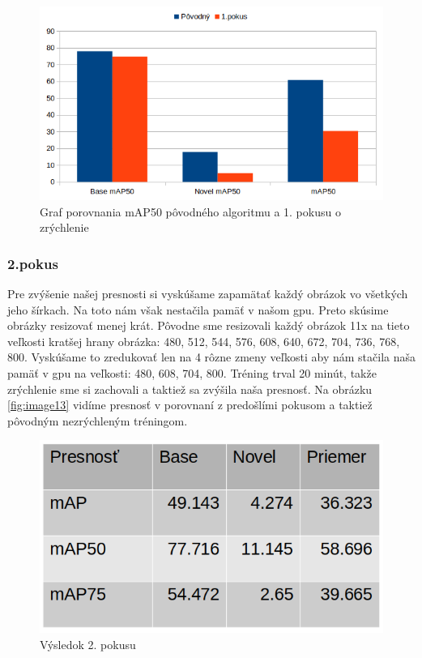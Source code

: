 \begin{figure}[H]
\centering
\includegraphics[width=\textwidth]{images/faster_1attempt_chart.png}
\caption{Graf porovnania mAP50 pôvodného algoritmu a 1. pokusu o zrýchlenie}
\label{fig:image11}
\end{figure}

\subsubsection{2.pokus}

Pre zvýšenie našej presnosti si vyskúšame zapamätať každý obrázok vo všetkých jeho šírkach. Na toto nám však nestačila pamäť v našom gpu. Preto skúsime obrázky resizovať menej krát. Pôvodne sme resizovali každý obrázok 11x na tieto veľkosti kratšej hrany obrázka: 480, 512, 544, 576, 608, 640, 672, 704, 736, 768, 800. Vyskúšame to zredukovať len na 4 rôzne zmeny veľkosti aby nám stačila naša pamäť v gpu na veľkosti: 480, 608, 704, 800. Tréning trval 20 minút, takže zrýchlenie sme si zachovali a taktiež sa zvýšila naša presnosť.  Na obrázku \ref{fig:image13} vidíme presnosť v porovnaní z predošlími pokusom a taktiež pôvodným nezrýchleným tréningom. 

\begin{figure}[H]
\centering
\includegraphics[width=\textwidth]{images/faster_2attempt_table.png}
\caption{Výsledok 2. pokusu}
\label{fig:image12}
\end{figure}

